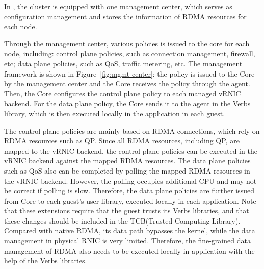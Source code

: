 In \sys, the cluster is equipped with one management center, which serves as configuration management and stores the information of RDMA resources for each node.


Through the management center, various policies is issued to the \sys core for each node, including: control plane policies, such as connection management, firewall, etc; data plane policies, such as QoS, traffic metering, etc. The management framework is shown in Figure~\ref{fig:mgmt-center}: the policy is issued to the \sys Core by the management center and the \sys Core receives the policy through the agent. Then, the \sys Core configures the control plane policy to each managed vRNIC backend. For the data plane policy, the \sys Core sends it to the agent in the Verbs library, which is then executed locally in the application in each guest.


The control plane policies are mainly based on RDMA connections, which rely on RDMA resources such as QP. Since all RDMA resources, including QP, are mapped to the vRNIC backend, the control plane policies can be executed in the vRNIC backend against the mapped RDMA resources. The data plane policies such as QoS also can be completed by polling the mapped RDMA resources in the vRNIC backend. However, the polling occupies additional CPU and may not be correct if polling is slow. Therefore, the data plane policies are further issued from \sys Core to each guest's user library, executed locally in each application. Note that these extensions require that the guest trusts its Verbs libraries, and that these changes should be included in the TCB(Trusted Computing Library). Compared with native RDMA, its data path bypasses the kernel, while the data management in physical RNIC is very limited. Therefore, the fine-grained data management of RDMA also needs to be executed locally in application with the help of the Verbs libraries.

